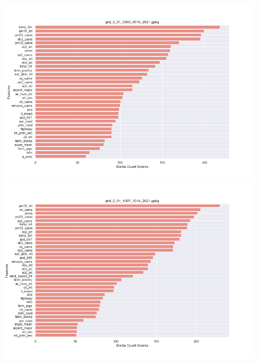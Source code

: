 \begin{center}
\includegraphics[width=.9\textwidth]{images/fs_results/pm25/001/montains/grid_0_01_0903_0910_2021.png}
\includegraphics[width=.9\textwidth]{images/fs_results/pm25/001/montains/grid_0_01_1007_1014_2021.png}
\end{center}

